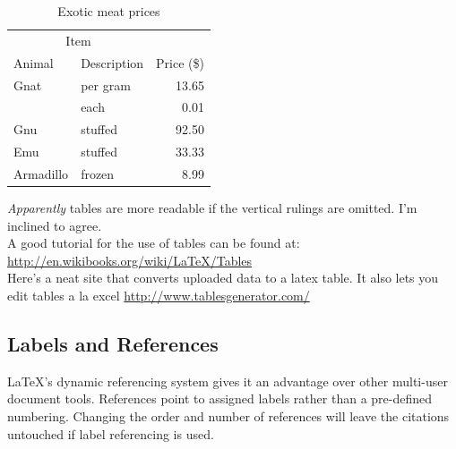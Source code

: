 \documentclass[12pt]{article}
\begin{document}
\begin{table}[h]			%
	\centering
	\begin{tabular}{llr}	%

		\hline		%
		
		\multicolumn{2}{c}{Item} \\		%
								
		\cline{1-2}		%
		
			Animal   	& Description 	& Price (\$) \\	%
		\hline
			Gnat		& per gram	& 13.65      \\
				        & each       	& 0.01       \\
			Gnu		& stuffed     	& 92.50      \\
			Emu		& stuffed		& 33.33      \\
			Armadillo	& frozen		& 8.99       \\
		\hline
	\end{tabular}
	\caption{Exotic meat prices}
	\label{table:meats}
\end{table}
\textit{Apparently} tables are more readable if the vertical rulings are omitted. I'm inclined to agree.\\
A good tutorial for the use of tables can be found at: \url{http://en.wikibooks.org/wiki/LaTeX/Tables}\\
Here's a neat site that converts uploaded data to a latex table. It also lets you edit tables a la excel \url{http://www.tablesgenerator.com/}

\subsection{Labels and References}\label{sec:labels_and_refs}
LaTeX's dynamic referencing system gives it an advantage over other multi-user document tools. References point to assigned labels rather than a pre-defined numbering. Changing the order and number of references will leave the citations untouched if label referencing is used.
\end{document}
